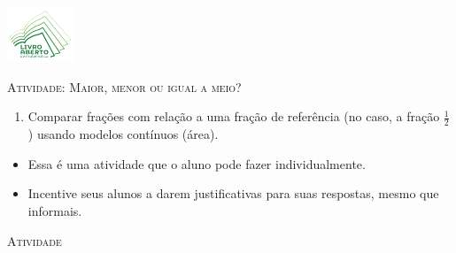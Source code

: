 \documentclass[10 pt,usenames,dvipsnames, oneside]{article}
\begin{document}
\begin{center}
  \begin{minipage}[l]{3cm}
\includegraphics[width=2cm]{../../../Figuras/logo}       
\end{minipage}\hfill
\begin{minipage}[r]{.8\textwidth}
 {\Large \scshape Atividade: Maior, menor ou igual a meio?}  
\end{minipage}
\end{center}
\vspace{.2cm}

\ifdefined\prof
\begin{goals}
\begin{enumerate}

    \item       Comparar frações com relação a uma fração de referência (no caso, a fração       $\frac{1}{2}$) usando modelos contínuos (área).

\end{enumerate}
\tcblower

\begin{itemize} %
\item Essa é uma atividade que o aluno pode fazer individualmente.
\item Incentive seus alunos a darem justificativas para suas respostas, mesmo que informais.
\end{itemize} %

\end{goals}

\bigskip
\begin{center}
{\large \scshape Atividade}
\end{center}
\fi
\end{document}
